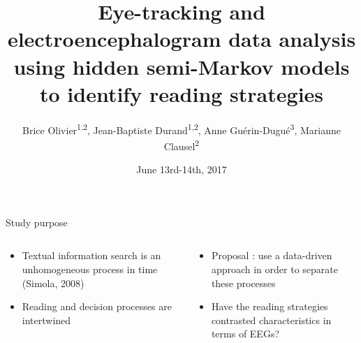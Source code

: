 \documentclass[final,hyperref={pdfpagelabels=false}]{beamer}
\title{Eye-tracking and electroencephalogram data analysis using hidden semi-Markov models to identify reading strategies}
\author{Brice Olivier\textsuperscript{1,2}, Jean-Baptiste Durand\textsuperscript{1,2}, Anne Guérin-Dugué\textsuperscript{3}, Marianne Clausel\textsuperscript{2}}
\institute{\textsuperscript{1}Inria, \textsuperscript{2}Laboratoire Jean Kuntzmann, \textsuperscript{3}Gipsa-lab}
\date[June 13rd-14th, 2017]{June 13rd-14th, 2017}
\begin{document}
\begin{frame}
    \begin{block}{Study purpose}
        \begin{columns}[T]
          \begin{column}{.50\paperwidth}
              \begin{itemize}
                  \item[\bullet] Textual information search is an unhomogeneous process in time (Simola, 2008)
                  \item[\drsh] Reading and decision processes are intertwined
              \end{itemize}
          \end{column}
          \begin{column}{.50\paperwidth}
              \begin{itemize}
                  \item[\bullet] Proposal : use a data-driven approach in order to separate these processes
                  \item[\bullet] Have the reading strategies contrasted characteristics in terms of EEGs?
              \end{itemize}
          \end{column}
        \end{columns}
    \end{block}


\end{frame}
\end{document}
